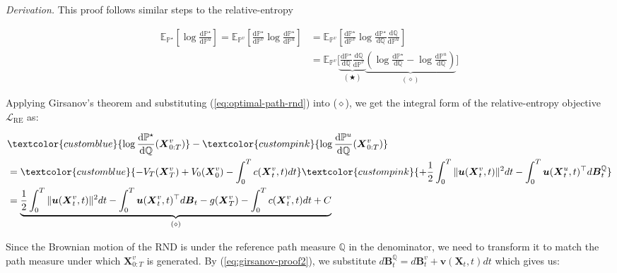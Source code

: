 \documentclass{article}
\newcommand{\bluetext}[1]{\textcolor{customblue}{#1}}
\newcommand{\pinktext}[1]{\textcolor{custompink}{#1}}
\begin{document}
\textit{Derivation.} This proof follows similar steps to the relative-entropy
\begin{small}
\begin{align}
\mathbb{E}_{\mathbb{P}^\star}\left[\log \frac{\mathrm{d}\mathbb{P}^\star}{\mathrm{d}\mathbb{P}^u}\right]=\mathbb{E}_{\mathbb{P}^v}\left[\frac{\mathrm{d}\mathbb{P}^\star}{\mathrm{d}\mathbb{P}^v}\log \frac{\mathrm{d}\mathbb{P}^\star}{\mathrm{d}\mathbb{P}^u}\right]&=\mathbb{E}_{\mathbb{P}^v}\left[\frac{\mathrm{d}\mathbb{P}^\star}{\mathrm{d}\mathbb{P}^v}\log \frac{\mathrm{d}\mathbb{P}^\star}{\mathrm{d}\mathbb{Q}}\frac{\mathrm{d}\mathbb{Q}}{\mathrm{d}\mathbb{P}^u}\right]\nonumber\\
&=\mathbb{E}_{\mathbb{P}^v}\bigg[\underbrace{\frac{\mathrm{d}\mathbb{P}^\star}{\mathrm{d}\mathbb{Q}}\frac{\mathrm{d}\mathbb{Q}}{\mathrm{d}\mathbb{P}^v}}_{(\bigstar)}\underbrace{\left(\log \frac{\mathrm{d}\mathbb{P}^\star}{\mathrm{d}\mathbb{Q}}-\log \frac{\mathrm{d}\mathbb{P}^u}{\mathrm{d}\mathbb{Q}}\right)}_{(\diamond)}\bigg]
\end{align}
\end{small}
Applying Girsanov's theorem and substituting (\ref{eq:optimal-path-rnd}) into ($\diamond$), we get the integral form of the relative-entropy objective $\mathcal{L}_{\text{RE}}$ as:
\begin{small}
\begin{align}
    &\bluetext{\log \frac{\mathrm{d}\mathbb{P}^\star}{\mathrm{d}\mathbb{Q}}(\boldsymbol{X}^v_{0:T})}-\pinktext{\log \frac{\mathrm{d}\mathbb{P}^u}{\mathrm{d}\mathbb{Q}}(\boldsymbol{X}^v_{0:T})}\nonumber\\
    &=\bluetext{-V_T(\boldsymbol{X}^v_T)+V_0(\boldsymbol{X}^v_0)-\int_0^Tc(\boldsymbol{X}^v_t,t)dt}\pinktext{+\frac{1}{2}\int_0^T\|\boldsymbol{u}(\boldsymbol{X}^v_t,t)\|^2dt-\int_0^T\boldsymbol{u}(\boldsymbol{X}^u_t,t)^\top d\boldsymbol{B}^{\mathbb{Q}}_t}\nonumber\\
    &=\underbrace{\frac{1}{2}\int_0^T\|\boldsymbol{u}(\boldsymbol{X}^v_t,t)\|^2dt-\int_0^T\boldsymbol{u}(\boldsymbol{X}^v_t,t)^\top d\boldsymbol{B}_t-g(\boldsymbol{X}^v_T)-\int_0^Tc(\boldsymbol{X}^v_t,t)dt+C}_{(\diamond)}\label{eq:ce-proof1}
\end{align}
\end{small}
Since the Brownian motion of the RND is under the reference path measure $\mathbb{Q}$ in the denominator, we need to transform it to match the path measure under which $\boldsymbol{X}_{0:T}^v$ is generated. By (\ref{eq:girsanov-proof2}), we substitute $d\boldsymbol{B}^{\mathbb{Q}}_t=d\boldsymbol{B}^v_t+\boldsymbol{v}(\boldsymbol{X}_t,t)dt$ which gives us:
\end{document}
